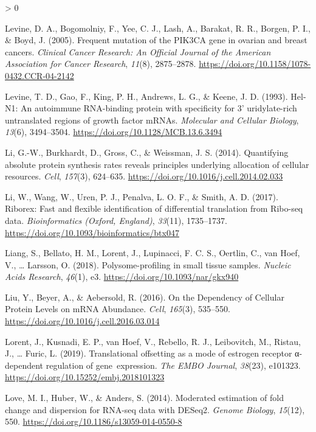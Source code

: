 \documentclass[
  12pt,
  openany]{book}
\newlength{\cslhangindent}
\newenvironment{CSLReferences}[2] %
 {%
  \setlength{\parindent}{0pt}
  \ifodd #1 \everypar{\setlength{\hangindent}{\cslhangindent}}\ignorespaces\fi
  \ifnum #2 > 0
  \setlength{\parskip}{#2\baselineskip}
  \fi
 }%
 {}
\begin{document}
\begin{CSLReferences}{1}{0}
\leavevmode\hypertarget{ref-Levine2005}{}%
Levine, D. A., Bogomolniy, F., Yee, C. J., Lash, A., Barakat, R. R., Borgen, P. I., \& Boyd, J. (2005). Frequent mutation of the {PIK3CA} gene in ovarian and breast cancers. \emph{Clinical Cancer Research: An Official Journal of the American Association for Cancer Research}, \emph{11}(8), 2875--2878. \url{https://doi.org/10.1158/1078-0432.CCR-04-2142}

\leavevmode\hypertarget{ref-Levine1993}{}%
Levine, T. D., Gao, F., King, P. H., Andrews, L. G., \& Keene, J. D. (1993). Hel-{N1}: An autoimmune {RNA}-binding protein with specificity for 3' uridylate-rich untranslated regions of growth factor {mRNAs}. \emph{Molecular and Cellular Biology}, \emph{13}(6), 3494--3504. \url{https://doi.org/10.1128/MCB.13.6.3494}

\leavevmode\hypertarget{ref-Li2014}{}%
Li, G.-W., Burkhardt, D., Gross, C., \& Weissman, J. S. (2014). Quantifying absolute protein synthesis rates reveals principles underlying allocation of cellular resources. \emph{Cell}, \emph{157}(3), 624--635. \url{https://doi.org/10.1016/j.cell.2014.02.033}

\leavevmode\hypertarget{ref-Li2017}{}%
Li, W., Wang, W., Uren, P. J., Penalva, L. O. F., \& Smith, A. D. (2017). Riborex: Fast and flexible identification of differential translation from {Ribo}-seq data. \emph{Bioinformatics (Oxford, England)}, \emph{33}(11), 1735--1737. \url{https://doi.org/10.1093/bioinformatics/btx047}

\leavevmode\hypertarget{ref-Liang2018}{}%
Liang, S., Bellato, H. M., Lorent, J., Lupinacci, F. C. S., Oertlin, C., van Hoef, V., \ldots{} Larsson, O. (2018). Polysome-profiling in small tissue samples. \emph{Nucleic Acids Research}, \emph{46}(1), e3. \url{https://doi.org/10.1093/nar/gkx940}

\leavevmode\hypertarget{ref-Liu2016}{}%
Liu, Y., Beyer, A., \& Aebersold, R. (2016). On the {Dependency} of {Cellular Protein Levels} on {mRNA Abundance}. \emph{Cell}, \emph{165}(3), 535--550. \url{https://doi.org/10.1016/j.cell.2016.03.014}

\leavevmode\hypertarget{ref-Lorent2019}{}%
Lorent, J., Kusnadi, E. P., van Hoef, V., Rebello, R. J., Leibovitch, M., Ristau, J., \ldots{} Furic, L. (2019). Translational offsetting as a mode of estrogen receptor α-dependent regulation of gene~expression. \emph{The EMBO Journal}, \emph{38}(23), e101323. \url{https://doi.org/10.15252/embj.2018101323}

\leavevmode\hypertarget{ref-Love2014}{}%
Love, M. I., Huber, W., \& Anders, S. (2014). Moderated estimation of fold change and dispersion for {RNA}-seq data with {DESeq2}. \emph{Genome Biology}, \emph{15}(12), 550. \url{https://doi.org/10.1186/s13059-014-0550-8}


\end{CSLReferences}
\end{document}
